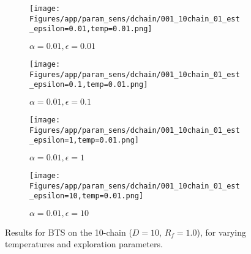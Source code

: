 \documentclass{article}
\theoremstyle{plain}
\begin{document}
\begin{appendices}
\begin{figure}
                \begin{subfigure}[b]{0.24\textwidth}
                    \centering
                    \texttt{[image: Figures/app/param\_sens/dchain/001\_10chain\_01\_est\_epsilon=0.01,temp=0.01.png]}
                    \caption*{$\alpha=0.01,\epsilon=0.01$}
                \end{subfigure}
                \begin{subfigure}[b]{0.24\textwidth}
                    \centering
                    \texttt{[image: Figures/app/param\_sens/dchain/001\_10chain\_01\_est\_epsilon=0.1,temp=0.01.png]}
                    \caption*{$\alpha=0.01,\epsilon=0.1$}
                \end{subfigure}
                \begin{subfigure}[b]{0.24\textwidth}
                    \centering
                    \texttt{[image: Figures/app/param\_sens/dchain/001\_10chain\_01\_est\_epsilon=1,temp=0.01.png]}
                    \caption*{$\alpha=0.01,\epsilon=1$}
                \end{subfigure}
                \begin{subfigure}[b]{0.24\textwidth}
                    \centering
                    \texttt{[image: Figures/app/param\_sens/dchain/001\_10chain\_01\_est\_epsilon=10,temp=0.01.png]}
                    \caption*{$\alpha=0.01,\epsilon=10$}
                \end{subfigure}
                
                \caption{Results for BTS on the 10-chain ($D=10$, $R_f=1.0$), for varying temperatures and exploration parameters.}
                \label{fig:bts_10chain_hps}
            \end{figure}


            \begin{figure}
                \centering
                

\end{figure}
\end{appendices}
\end{document}
